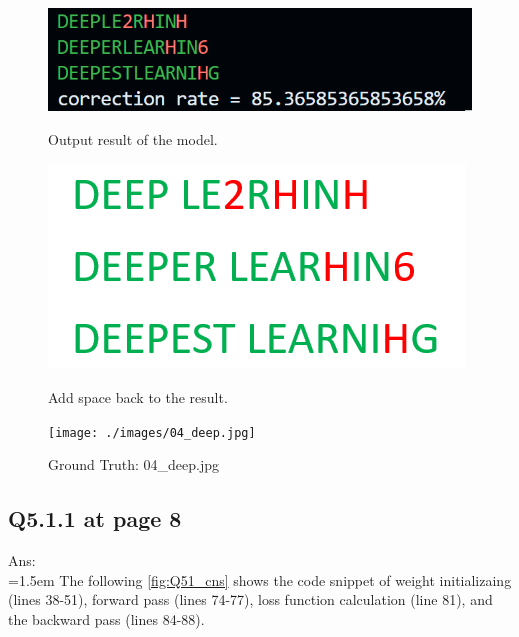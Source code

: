 \documentclass{article}
\begin{document}
\begin{figure}[H]
	\centering
	\begin{minipage}{0.33\linewidth}
		\centering
		\includegraphics[width=\linewidth]{./Q44_res4.png}
		\caption{Output result of the model.}
		\label{fig:Q44_res4}
	\end{minipage}%
	\hfill
	\begin{minipage}{0.33\linewidth}
		\centering
		\includegraphics[width=0.8\linewidth, height=0.24\columnwidth]{./Q44_add_space4.png}
		\caption{Add space back to the result.}
		\label{fig:Q44_add_space4}
	\end{minipage}%
	\hfill
	\begin{minipage}{0.33\linewidth}
		\centering
		\texttt{[image: ./images/04\_deep.jpg]}
		\caption{Ground Truth: 04\_deep.jpg}
		\label{fig:Q44_res4_gt}
	\end{minipage}
\end{figure}

	\newpage
	
	\subsection*{Q5.1.1 at page 8\texttt{}}
	Ans:\\
	\hangindent=1.5em \hspace{1.5em}The following \autoref{fig:Q51_cns} shows the code snippet of weight initializaing (lines 38-51), forward pass (lines 74-77), loss function calculation (line 81), and the backward pass (lines 84-88).
	\newline
	
\end{document}
